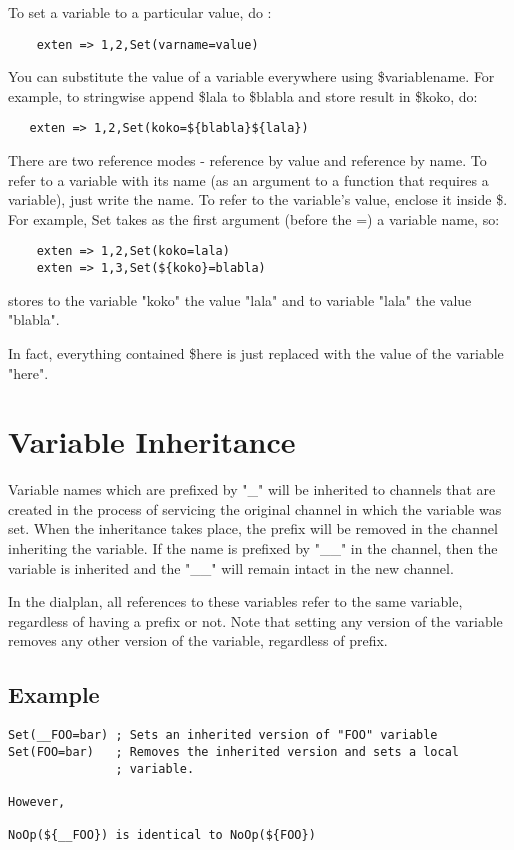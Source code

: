 To set a variable to a particular value, do : 
\begin{verbatim}
    exten => 1,2,Set(varname=value)
\end{verbatim}
You can substitute the value of a variable everywhere using \${variablename}.
For example, to stringwise append \$lala to \$blabla and store result in \$koko, 
do: 
\begin{verbatim}
   exten => 1,2,Set(koko=${blabla}${lala})
\end{verbatim}

There are two reference modes - reference by value and reference by name. 
To refer to a variable with its name (as an argument to a function that 
requires a variable), just write the name. To refer to the variable's value, 
enclose it inside \${}. For example, Set takes as the first argument 
(before the =) a variable name, so: 
\begin{verbatim}
	exten => 1,2,Set(koko=lala)
	exten => 1,3,Set(${koko}=blabla)
\end{verbatim}
stores to the variable "koko" the value "lala" and to variable "lala" the 
value "blabla". 

In fact, everything contained \${here} is just replaced with the value of 
the variable "here". 

\section{Variable Inheritance}

Variable names which are prefixed by "\_" will be inherited to channels 
that are created in the process of servicing the original channel in 
which the variable was set.  When the inheritance takes place, the 
prefix will be removed in the channel inheriting the variable.  If the 
name is prefixed by "\_\_" in the channel, then the variable is 
inherited and the "\_\_" will remain intact in the new channel.

In the dialplan, all references to these variables refer to the same 
variable, regardless of having a prefix or not.  Note that setting any 
version of the variable removes any other version of the variable, 
regardless of prefix.

\subsection{Example}
\begin{verbatim}
Set(__FOO=bar) ; Sets an inherited version of "FOO" variable 
Set(FOO=bar)   ; Removes the inherited version and sets a local 
               ; variable.

However,

NoOp(${__FOO}) is identical to NoOp(${FOO})
\end{verbatim}


